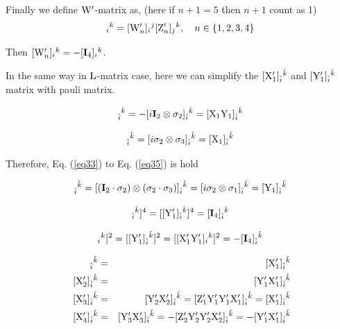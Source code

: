 \documentclass[12pt]{article}
\def\rL{{\rm L}}
\let\bm\relax
\newcommand{\bm}[1]{{\boldsymbol{#1}}}
\begin{document}
Finally we define $\bm{\rm W}'$-matrix as, (here if $n+1=5$ then $n+1$ count as 1)
\begin{equation}
[{\bm{\rm Z}}'_{n+1}]_{i}{}^{k}=[{\bm{\rm W}}'_n]_{i}{}^{j}[{\bm{\rm Z}}'_n]_{j}{}^{k},\quad n\in\{1,2,3,4\}
\label{eq4-32}
\end{equation}

Then $[{\bm{\rm W}}'_n]_{i}{}^{k}=-[\mathbf{I}_{4}]_{i}{}^{k}$.

In the same way in $\bm\rL$-matrix case, here we can simplify the $[{\bm{\rm X}}'_{1}]_{\hat i}{}^{\hat k}$ and $[{\bm{\rm Y}}'_{1}]_{\hat i}{}^{\hat k}$ matrix with pauli matrix.

\begin{equation}
[{\bm{\rm X}}'_{1}]_{\hat i}{}^{\hat k}=-[i\mathbf{I}_2\otimes \sigma_2]_{\hat i}{}^{\hat k}=[{\bm{\rm X_1Y_1}}]_{\hat i}{}^{\hat k}
\end{equation}

\begin{equation}
[{\bm{\rm Y}}'_{1}]_{\hat i}{}^{\hat k}=[i\sigma_2\otimes \sigma_3]_{\hat i}{}^{\hat k}=[{\bm{\rm X_1}}]_{\hat i}{}^{\hat k}
\end{equation}

Therefore, Eq. (\ref{eq33}) to Eq. (\ref{eq35}) is hold

\begin{equation}
[{\bm{\rm X'_{1}Y'_1}}]_{\hat i}{}^{\hat k}=[(\mathbf{I}_2\cdot\sigma_2)\otimes(\sigma_2\cdot\sigma_3)]_{\hat i}{}^{\hat k}=[i\sigma_2\otimes\sigma_1]_{\hat i}{}^{\hat k}=[{\bm{\rm Y}}_1]_{\hat i}{}^{\hat k}
\label{eq33}
\end{equation}

\begin{equation}
[[{\bm{\rm X}}'_{1}]_{\hat i}{}^{\hat k}]^4=[[{\bm{\rm Y}}'_1]_{\hat i}{}^{\hat k}]^4=[\mathbf{I}_4]_{\hat i}{}^{\hat k}
\end{equation}

\begin{equation}
[[{\bm{\rm X}}'_{1}]_{i}{}^{k}]^2=[[{\bm{\rm Y}}'_1]_{\hat i}{}^{\hat k}]^2=[[ {\bm{\rm X'_1Y'_1}}]_{i}{}^{k}]^2=-[\mathbf{I}_4]_{\hat i}{}^{\hat k}
\label{eq35}
\end{equation}

\begin{eqnarray}
[{\bm{\rm X}}'_1]_{\hat i}{}^{\hat k}&=&[{\bm{\rm X}}'_1]_{\hat i}{}^{\hat k}
\label{eq36}\\
\
[{\bm{\rm X}}'_2]_{\hat i}{}^{\hat k}&=&[{\bm{\rm Y'_1X'_1}}]_{\hat i}{}^{\hat k}\\
\
[{\bm{\rm X}}'_3]_{\hat i}{}^{\hat k}&=&[{\bm{\rm Y'_2X'_2}}]_{\hat i}{}^{\hat k}
=[{\bm{\rm Z'_1Y'_1Y'_1X'_1}}]_{\hat i}{}^{\hat k}
=[{\bm{\rm X}}'_1]_{\hat i}{}^{\hat k}\\
\
[{\bm{\rm X}}'_4]_{\hat i}{}^{\hat k}&=&[{\bm{\rm Y'_3X'_3}}]_{\hat i}{}^{\hat k}
=-[{\bm{\rm Z'_2Y'_2Y'_2X'_2}}]_{\hat i}{}^{\hat k}
=-[{\bm{\rm Y'_1X'_1}}]_{\hat i}{}^{\hat k}
\label{eq39}
\end{eqnarray}
\end{document}
